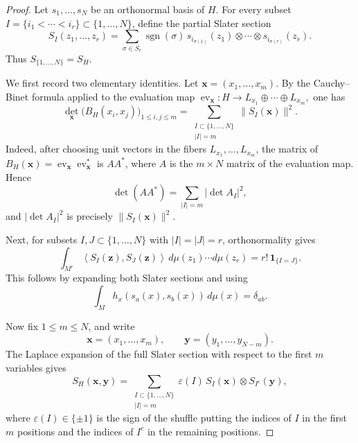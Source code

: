 \documentclass[12pt,a4paper,reqno]{article}
\theoremstyle{thmstyleone}
\theoremstyle{thmstylethree}
\theoremstyle{thmstyletwo}
\numberwithin{equation}{subsection}
\def\leq{\leqslant}
\begin{document}
\begin{proof}
Let $s_1,\ldots,s_N$ be an orthonormal basis of $H$. For every subset $I=\{i_1<\cdots<i_r\}\subset\{1,\ldots,N\}$, define the partial Slater section
\[
S_I(z_1,\ldots,z_r)
=
\sum_{\sigma\in S_r}
\operatorname{sgn}(\sigma)\,
s_{i_{\sigma(1)}}(z_1)\otimes\cdots\otimes s_{i_{\sigma(r)}}(z_r).
\]
Thus $S_{\{1,\ldots,N\}}=S_H$.

We first record two elementary identities. Let $\mathbf x=(x_1,\ldots,x_m)$. By the Cauchy--Binet formula applied to the evaluation map $\operatorname{ev}_{\mathbf x}:H\longrightarrow
L_{x_1}\oplus\cdots\oplus L_{x_m},$ one has
\begin{equation}\label{eq:32}
\det_{\mathbf x}\bigl(B_H(x_i,x_j)\bigr)_{1\leq i,j\leq m}
=
\sum_{\substack{I\subset\{1,\ldots,N\}\\ |I|=m}}
\|S_I(\mathbf x)\|^2.
\end{equation}
Indeed, after choosing unit vectors in the fibers $L_{x_1},\ldots,L_{x_m}$, the matrix of $B_H(\mathbf x)=\operatorname{ev}_{\mathbf x}\operatorname{ev}_{\mathbf x}^*$ is $AA^*$, where $A$ is the $m\times N$ matrix of the evaluation map. Hence
\[
\det(AA^*)
=
\sum_{|I|=m} |\det A_I|^2,
\]
and $|\det A_I|^2$ is precisely $\|S_I(\mathbf x)\|^2$.

Next, for subsets $I,J\subset\{1,\ldots,N\}$ with $|I|=|J|=r$, orthonormality gives
\begin{equation}\label{eq:33}
\int_{M^r}
\left\langle
S_I(\mathbf z),S_J(\mathbf z)
\right\rangle
\,d\mu(z_1)\cdots d\mu(z_r)
=
r!\,\mathbf 1_{\{I=J\}}.
\end{equation}
This follows by expanding both Slater sections and using
\[
\int_M h_x(s_a(x),s_b(x))\,d\mu(x)=\delta_{ab}.
\]

Now fix $1\leq m\leq N$, and write
\[
\mathbf x=(x_1,\ldots,x_m),
\qquad
\mathbf y=(y_1,\ldots,y_{N-m}).
\]
The Laplace expansion of the full Slater section with respect to the first $m$ variables gives
\[
S_H(\mathbf x,\mathbf y)
=
\sum_{\substack{I\subset\{1,\ldots,N\}\\ |I|=m}}
\varepsilon(I)\,
S_I(\mathbf x)\otimes S_{I^c}(\mathbf y),
\]
where $\varepsilon(I)\in\{\pm1\}$ is the sign of the shuffle putting the indices of $I$ in the first $m$ positions and the indices of $I^c$ in the remaining positions.


\end{proof}
\end{document}
